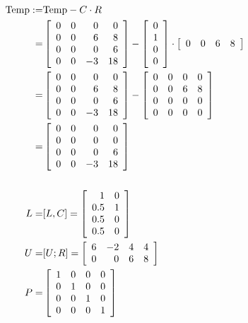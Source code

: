 \begin{align*}
    {\rm Temp} :=& {\rm Temp} - C \cdot R \\
    =& \left[\begin{array}{rrrr} 0 & 0 & 0 & 0\\ 0 & 0 & 6 & 8 \\ 0 & 0 & 0 & 6 \\0 & 0 & -3 & 18 \end{array}\right]
    - \left[ \begin{array}{r} 0 \\ 1 \\ 0 \\ 0 \end{array} \right] \cdot \left[ \begin{array}{rrrr} 0 & 0 & 6 & 8 \end{array} \right] \\
    =& \left[\begin{array}{rrrr} 0 & 0 & 0 & 0\\ 0 & 0 & 6 & 8 \\ 0 & 0 & 0 & 6 \\0 & 0 & -3 & 18 \end{array}\right] - \left[ \begin{array}{rrrr} 0 & 0 & 0 & 0\\ 0 & 0 & 6 & 8 \\ 0 & 0 & 0 & 0 \\ 0 & 0 & 0 & 0 \end{array} \right] \\
    =& \left[\begin{array}{rrrr} 0 & 0 & 0 & 0\\ 0 & 0 & 0 & 0 \\ 0 & 0 & 0 & 6 \\0 & 0 & -3 & 18 \end{array}\right] \\
    \\
    L =& [L, C] = \left[ \begin{array}{rr} 1 & 0 \\ 0.5 & 1 \\ 0.5 & 0 \\ 0.5 & 0 \end{array} \right] \\
    U =& [U; R] = \left[ \begin{array}{rrrr} 6 & -2 & 4 & 4 \\ 0 & 0 & 6 & 8 \end{array}\right] \\
    P =& \left[\begin{array}{rrrr} 1 & 0 & 0 & 0\\ 0 & 1 & 0 & 0 \\ 0 & 0 & 1 & 0 \\0 & 0 & 0 & 1 \end{array}\right] 
\end{align*}

